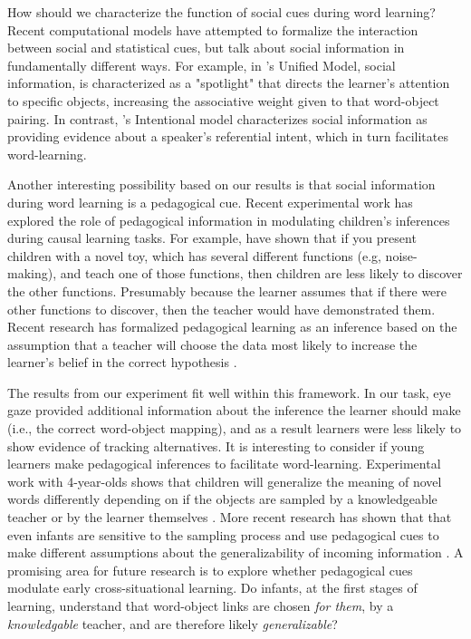 \documentclass[man]{apa2}
\begin{document}
How should we characterize the function of social cues during word learning? Recent computational models have attempted to formalize the interaction between social and statistical cues, but talk about social information in fundamentally different ways. For example, in 's Unified Model, social information, is characterized as a "spotlight" that directs the learner's attention to specific objects, increasing the associative weight given to that word-object pairing.  In contrast, 's Intentional model characterizes social information as providing evidence about a speaker's referential intent, which in turn facilitates word-learning.

Another interesting possibility based on our results is that social information during word learning is a pedagogical cue. Recent experimental work has explored the role of pedagogical information in modulating children's inferences during causal learning tasks. For example,  have shown that if you present children with a novel toy, which has several different functions (e.g, noise-making), and teach one of those functions, then children are less likely to discover the other functions. Presumably because the learner assumes that if there were other functions to discover, then the teacher would have demonstrated them.  Recent research has formalized pedagogical learning as an inference based on the assumption that a teacher will choose the data most likely to increase the learner's belief in the correct hypothesis \cite{shafto2012learning}. 

The results from our experiment fit well within this framework. In our task, eye gaze provided additional information about the inference the learner should make (i.e., the correct word-object mapping), and as a result learners were less likely to show evidence of tracking alternatives. It is interesting to consider if young learners make pedagogical inferences to facilitate word-learning. Experimental work with 4-year-olds shows that children will generalize the meaning of novel words differently depending on if the objects are sampled by a knowledgeable teacher or by the learner themselves \cite{xu2007sampling}. More recent research has shown that that even infants are sensitive to the sampling process \cite{} and use pedagogical cues to make different assumptions about the generalizability of incoming information \cite{csibra2009natural}. A promising area for future research is to explore whether pedagogical cues modulate early cross-situational learning. Do infants, at the first stages of learning, understand that word-object links are chosen  \emph{for them}, by a \emph{knowledgable} teacher, and are therefore likely \emph{generalizable}?
\end{document}
